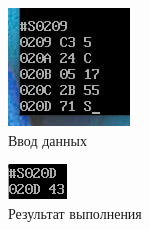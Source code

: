 \documentclass[14pt]{extarticle}
\begin{document}
\begin{figure}[H]
\centering
\includegraphics[width=.9\linewidth]{images/2023-04-11_12-30-46_screenshot.png}
\caption{Ввод данных}
\end{figure}

\begin{figure}[H]
\centering
\includegraphics[width=.9\linewidth]{images/2023-04-11_12-31-25_screenshot.png}
\caption{Результат выполнения}
\end{figure}
\end{document}
